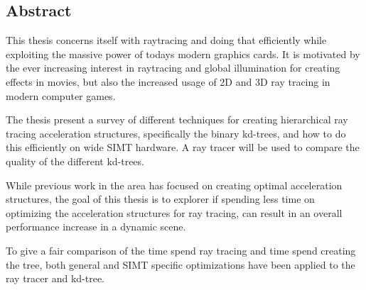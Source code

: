 

\begin{center}
\begin{minipage}{0.7\textwidth}
\section*{Abstract}

This thesis concerns itself with raytracing and doing that efficiently
while exploiting the massive power of todays modern graphics cards. It
is motivated by the ever increasing interest in raytracing and global
illumination for creating effects in movies, but also the increased
usage of 2D and 3D ray tracing in modern computer games.

The thesis present a survey of different techniques for creating
hierarchical ray tracing acceleration structures, specifically the
binary kd-trees, and how to do this efficiently on wide SIMT
hardware. A ray tracer will be used to compare the quality of the
different kd-trees.

While previous work in the area has focused on creating optimal
acceleration structures, the goal of this thesis is to explorer if
spending less time on optimizing the acceleration structures for ray
tracing, can result in an overall performance increase in a dynamic
scene.


To give a fair comparison of the time spend ray tracing and time spend
creating the tree, both general and SIMT specific optimizations have
been applied to the ray tracer and kd-tree.

\end{minipage}
\end{center}










